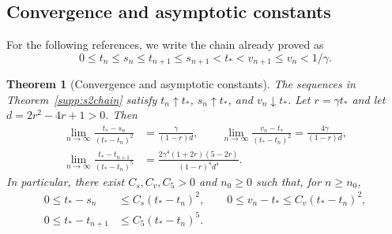 \documentclass[11pt,a4paper]{article}
\numberwithin{equation}{section}
\numberwithin{table}{section}
\theoremstyle{plain}
\newtheorem{theorem}{Theorem}[section]
\theoremstyle{definition}\newtheorem{definition}[theorem]{Definition}
\theoremstyle{remark}\newtheorem{remark}[theorem]{Remark}
\begin{document}
\subsection{Convergence and asymptotic constants}
For the following references, we write the chain already proved as
\begin{equation}
0\leq t_n\leq s_n\leq t_{n+1}\leq s_{n+1}<t_*<v_{n+1}\leq v_n<1/\gamma.
\label{supp:eq:scalar-chain}
\end{equation}
\begin{theorem}[Convergence and asymptotic constants]\label{supp:s2asymptotics}
The sequences in Theorem~\ref{supp:s2chain} satisfy $t_n\uparrow t_*$,
$s_n\uparrow t_*$, and $v_n\downarrow t_*$. Let $r=\gamma t_*$
and let $d=2r^2-4r+1>0$. Then
\begin{equation}
\begin{aligned}
\lim_{n\to\infty}\frac{t_*-s_n}{(t_*-t_n)^2}
 &=\frac{\gamma}{(1-r)d},\qquad
\lim_{n\to\infty}\frac{v_n-t_*}{(t_*-t_n)^2}
 =\frac{4\gamma}{(1-r)d},\\
\lim_{n\to\infty}\frac{t_*-t_{n+1}}{(t_*-t_n)^5}
 &=\frac{2\gamma^4(1+2r)(5-2r)}{(1-r)^4d^4}.
\end{aligned}
\label{supp:eq:scalar-asymptotic-constants}
\end{equation}
In particular, there exist $C_s,C_v,C_5>0$ and $n_0\geq0$ such that,
for $n\geq n_0$,
\begin{equation}
\begin{aligned}
0\leq t_*-s_n&\leq C_s(t_*-t_n)^2,\qquad
0\leq v_n-t_*\leq C_v(t_*-t_n)^2,\\
0\leq t_*-t_{n+1}&\leq C_5(t_*-t_n)^5.
\end{aligned}
\label{supp:eq:scalar-error-bounds}
\end{equation}
\end{theorem}
\end{document}
